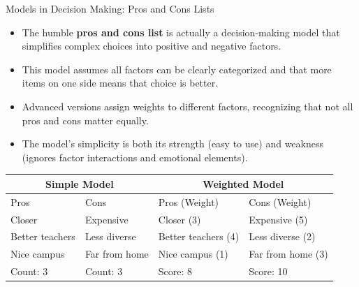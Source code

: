 \documentclass{beamer}
\begin{document}
	
\begin{frame}{Models in Decision Making: Pros and Cons Lists}
	\begin{itemize}
		\item The humble \textbf{pros and cons list} is actually a decision-making model that simplifies complex choices into positive and negative factors.
		\item This model assumes all factors can be clearly categorized and that more items on one side means that choice is better.
		\item Advanced versions assign weights to different factors, recognizing that not all pros and cons matter equally.
		\item The model's simplicity is both its strength (easy to use) and weakness (ignores factor interactions and emotional elements).
	\end{itemize}
	
	\begin{table}
		\centering
		\small
		\begin{tabular}{ll|ll}
			\multicolumn{2}{c|}{Simple Model} & \multicolumn{2}{c}{Weighted Model} \\
			\hline
			Pros & Cons & Pros (Weight) & Cons (Weight) \\
			\hline
			Closer & Expensive & Closer (3) & Expensive (5) \\
			Better teachers & Less diverse & Better teachers (4) & Less diverse (2) \\
			Nice campus & Far from home & Nice campus (1) & Far from home (3) \\
			\hline
			Count: 3 & Count: 3 & Score: 8 & Score: 10 \\
		\end{tabular}
	\end{table}
\end{frame}
\end{document}
